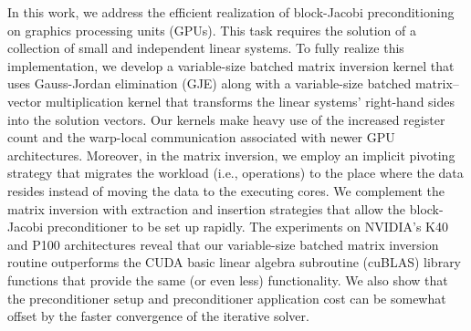 In this work, we address the efficient realization of
block-Jacobi preconditioning on graphics processing units (GPUs). This task
requires the solution of a collection of small and independent linear systems.
To fully realize this implementation, we develop a variable-size batched matrix inversion
kernel that uses Gauss-Jordan elimination (GJE) along with a variable-size
batched matrix--vector multiplication kernel that transforms the linear systems'
right-hand sides into the solution vectors. Our kernels make heavy use of the
increased register count and the warp-local communication associated with newer GPU
architectures. Moreover, in the matrix inversion, we employ an implicit pivoting
strategy that migrates the workload (i.e., operations) to the place where the
data resides
instead of moving the data to the executing cores.
We complement the matrix inversion with extraction and insertion strategies that
allow the block-Jacobi preconditioner to be set up rapidly. The experiments on
NVIDIA's K40 and P100 architectures reveal that our variable-size batched matrix inversion 
routine outperforms the CUDA basic linear algebra subroutine (cuBLAS) library functions that provide the same
(or even less) functionality.
We also show that the preconditioner setup and preconditioner application cost
can be somewhat offset by the faster convergence of the iterative solver.
